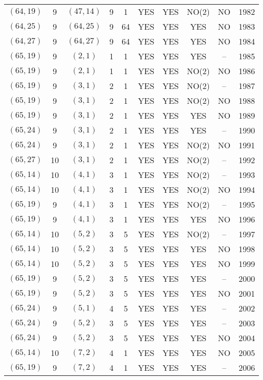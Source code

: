 \begin{longtable}{|c|c|c|c|c|c|c|c|c|c|}
$(64, 19)$ & 9 & $(47, 14)$ & 9 & 1 & YES & YES & NO(2) & NO & 1982\\
$(64, 25)$ & 9 & $(64, 25)$ & 9 & 64 & YES & YES & YES & NO & 1983\\
$(64, 27)$ & 9 & $(64, 27)$ & 9 & 64 & YES & YES & YES & NO & 1984\\
$(65, 19)$ & 9 & $(2, 1)$ & 1 & 1 & YES & YES & YES & -- & 1985\\
$(65, 19)$ & 9 & $(2, 1)$ & 1 & 1 & YES & YES & NO(2) & NO & 1986\\
$(65, 19)$ & 9 & $(3, 1)$ & 2 & 1 & YES & YES & NO(2) & -- & 1987\\
$(65, 19)$ & 9 & $(3, 1)$ & 2 & 1 & YES & YES & NO(2) & NO & 1988\\
$(65, 19)$ & 9 & $(3, 1)$ & 2 & 1 & YES & YES & YES & NO & 1989\\
$(65, 24)$ & 9 & $(3, 1)$ & 2 & 1 & YES & YES & YES & -- & 1990\\
$(65, 24)$ & 9 & $(3, 1)$ & 2 & 1 & YES & YES & NO(2) & NO & 1991\\
$(65, 27)$ & 10 & $(3, 1)$ & 2 & 1 & YES & YES & NO(2) & -- & 1992\\
$(65, 14)$ & 10 & $(4, 1)$ & 3 & 1 & YES & YES & NO(2) & -- & 1993\\
$(65, 14)$ & 10 & $(4, 1)$ & 3 & 1 & YES & YES & NO(2) & NO & 1994\\
$(65, 19)$ & 9 & $(4, 1)$ & 3 & 1 & YES & YES & NO(2) & -- & 1995\\
$(65, 19)$ & 9 & $(4, 1)$ & 3 & 1 & YES & YES & YES & NO & 1996\\
$(65, 14)$ & 10 & $(5, 2)$ & 3 & 5 & YES & YES & NO(2) & -- & 1997\\
$(65, 14)$ & 10 & $(5, 2)$ & 3 & 5 & YES & YES & YES & NO & 1998\\
$(65, 14)$ & 10 & $(5, 2)$ & 3 & 5 & YES & YES & YES & NO & 1999\\
$(65, 19)$ & 9 & $(5, 2)$ & 3 & 5 & YES & YES & YES & -- & 2000\\
$(65, 19)$ & 9 & $(5, 2)$ & 3 & 5 & YES & YES & YES & NO & 2001\\
$(65, 24)$ & 9 & $(5, 1)$ & 4 & 5 & YES & YES & YES & -- & 2002\\
$(65, 24)$ & 9 & $(5, 2)$ & 3 & 5 & YES & YES & YES & -- & 2003\\
$(65, 24)$ & 9 & $(5, 2)$ & 3 & 5 & YES & YES & YES & NO & 2004\\
$(65, 14)$ & 10 & $(7, 2)$ & 4 & 1 & YES & YES & YES & NO & 2005\\
$(65, 19)$ & 9 & $(7, 2)$ & 4 & 1 & YES & YES & YES & -- & 2006\\

\end{longtable}
